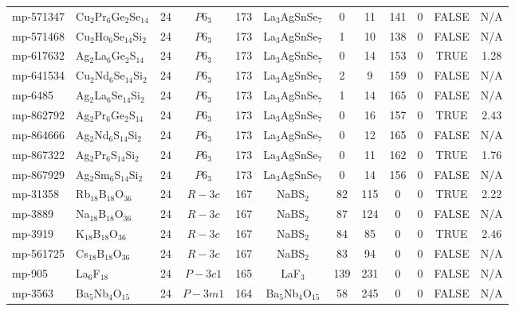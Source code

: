 {\begin{longtable}{llcccccccccc}
    mp-571347 & Cu$_{2}$Pr$_{6}$Ge$_{2}$Se$_{14}$ & 24    & $P6_3$ & 173   & La$_{3}$AgSnSe$_{7}$ & 0     & 11    & 141   & 0     & FALSE & N/A \\
    mp-571468 & Cu$_{2}$Ho$_{6}$Se$_{14}$Si$_{2}$ & 24    & $P6_3$ & 173   & La$_{3}$AgSnSe$_{7}$ & 1     & 10    & 138   & 0     & FALSE & N/A \\
    mp-617632 & Ag$_{2}$La$_{6}$Ge$_{2}$S$_{14}$ & 24    & $P6_3$ & 173   & La$_{3}$AgSnSe$_{7}$ & 0     & 14    & 153   & 0     & TRUE  & 1.28  \\
    mp-641534 & Cu$_{2}$Nd$_{6}$Se$_{14}$Si$_{2}$ & 24    & $P6_3$ & 173   & La$_{3}$AgSnSe$_{7}$ & 2     & 9     & 159   & 0     & FALSE & N/A \\
    mp-6485 & Ag$_{2}$La$_{6}$Se$_{14}$Si$_{2}$ & 24    & $P6_3$ & 173   & La$_{3}$AgSnSe$_{7}$ & 1     & 14    & 165   & 0     & FALSE & N/A \\
    mp-862792 & Ag$_{2}$Pr$_{6}$Ge$_{2}$S$_{14}$ & 24    & $P6_3$ & 173   & La$_{3}$AgSnSe$_{7}$ & 0     & 16    & 157   & 0     & TRUE  & 2.43  \\
    mp-864666 & Ag$_{2}$Nd$_{6}$S$_{14}$Si$_{2}$ & 24    & $P6_3$ & 173   & La$_{3}$AgSnSe$_{7}$ & 0     & 12    & 165   & 0     & FALSE & N/A \\
    mp-867322 & Ag$_{2}$Pr$_{6}$S$_{14}$Si$_{2}$ & 24    & $P6_3$ & 173   & La$_{3}$AgSnSe$_{7}$ & 0     & 11    & 162   & 0     & TRUE  & 1.76  \\
    mp-867929 & Ag$_{2}$Sm$_{6}$S$_{14}$Si$_{2}$ & 24    & $P6_3$ & 173   & La$_{3}$AgSnSe$_{7}$ & 0     & 14    & 156   & 0     & FALSE & N/A \\
    mp-31358 & Rb$_{18}$B$_{18}$O$_{36}$ & 24    & $R-3c$ & 167   & NaBS$_{2}$ & 82    & 115   & 0     & 0     & TRUE  & 2.22  \\
    mp-3889 & Na$_{18}$B$_{18}$O$_{36}$ & 24    & $R-3c$ & 167   & NaBS$_{2}$ & 87    & 124   & 0     & 0     & FALSE & N/A \\
    mp-3919 & K$_{18}$B$_{18}$O$_{36}$ & 24    & $R-3c$ & 167   & NaBS$_{2}$ & 84    & 85    & 0     & 0     & TRUE  & 2.46  \\
    mp-561725 & Cs$_{18}$B$_{18}$O$_{36}$ & 24    & $R-3c$ & 167   & NaBS$_{2}$ & 83    & 94    & 0     & 0     & FALSE & N/A \\
    mp-905 & La$_{6}$F$_{18}$ & 24    & $P-3c1$ & 165   & LaF$_{3}$ & 139   & 231   & 0     & 0     & FALSE & N/A \\
    mp-3563 & Ba$_{5}$Nb$_{4}$O$_{15}$ & 24    & $P-3m1$ & 164   & Ba$_{5}$Nb$_{4}$O$_{15}$ & 58    & 245   & 0     & 0     & FALSE & N/A \\

\end{longtable}}
